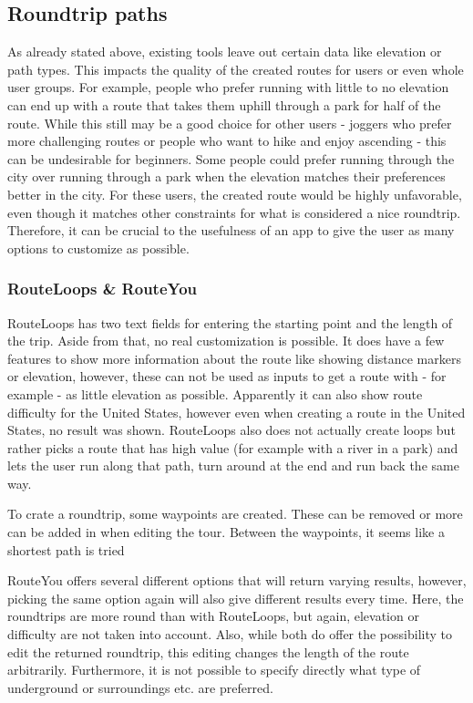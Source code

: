 \subsection{Roundtrip paths}
\label{subsec:Roudtrip}
As already stated above, existing tools leave out certain data like elevation or path types.
This impacts the quality of the created routes for users or even whole user groups. 
For example, people who prefer running with little to no elevation can end up with a route that takes them uphill through a park for half of the route.
While this still may be a good choice for other users - joggers who prefer more challenging routes or people who want to hike and enjoy ascending - this can be undesirable for beginners.
Some people could prefer running through the city over running through a park when the elevation matches their preferences better in the city.
For these users, the created route would be highly unfavorable, even though it matches other constraints for what is considered a nice roundtrip.
Therefore, it can be crucial to the usefulness of an app to give the user as many options to customize as possible. 


\subsubsection{RouteLoops \& RouteYou}
\label{subsubsec:routeLoopsrouteYou}
RouteLoops has two text fields for entering the starting point and the length of the trip.
Aside from that, no real customization is possible.
It does have a few features to show more information about the route like showing distance markers or elevation, however, these can not be used as inputs to get a route with - for example - as little elevation as possible.
Apparently it can also show route difficulty for the United States, however even when creating a route in the United States, no result was shown. 
RouteLoops also does not actually create loops but rather picks a route that has high value (for example with a river in a park) and lets the user run along that path, turn around at the end and run back the same way.

To crate a roundtrip, some \glqq waypoints\grqq{} are created. 
These can be removed or more can be added in when editing the tour.
Between the waypoints, it seems like a shortest path is tried 

RouteYou offers several different options that will return varying results, however, picking the same option again will also give different results every time.   
Here, the roundtrips are more round than with RouteLoops, but again, elevation or difficulty are not taken into account. 
Also, while both do offer the possibility to edit the returned roundtrip, this editing changes the length of the route arbitrarily.
Furthermore, it is not possible to specify directly what type of underground or surroundings etc. are preferred. 

